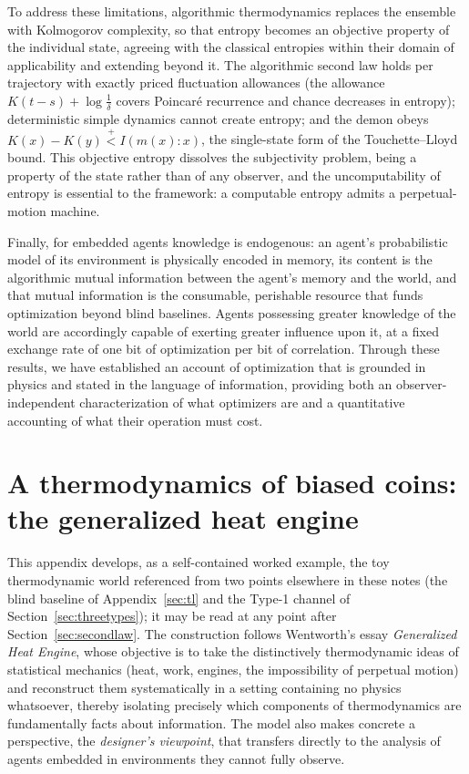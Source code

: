 \documentclass[10pt]{article}
\theoremstyle{definition}
\theoremstyle{remark}
\newcommand{\plt}{\mathrel{\stackrel{+}{<}}}
\begin{document}
To address these limitations, algorithmic thermodynamics replaces the ensemble with Kolmogorov complexity, so that entropy becomes an objective property of the individual state, agreeing with the classical entropies within their domain of applicability and extending beyond it. The algorithmic second law holds per trajectory with exactly priced fluctuation allowances (the allowance $K(t-s) + \log\frac1\delta$ covers Poincar\'e recurrence and chance decreases in entropy); deterministic simple dynamics cannot create entropy; and the demon obeys $K(x) - K(y) \plt I(m(x):x)$, the single-state form of the Touchette--Lloyd bound. This objective entropy dissolves the subjectivity problem, being a property of the state rather than of any observer, and the uncomputability of entropy is essential to the framework: a computable entropy admits a perpetual-motion machine.

Finally, for embedded agents knowledge is endogenous: an agent's probabilistic model of its environment is physically encoded in memory, its content is the algorithmic mutual information between the agent's memory and the world, and that mutual information is the consumable, perishable resource that funds optimization beyond blind baselines. Agents possessing greater knowledge of the world are accordingly capable of exerting greater influence upon it, at a fixed exchange rate of one bit of optimization per bit of correlation. Through these results, we have established an account of optimization that is grounded in physics and stated in the language of information, providing both an observer-independent characterization of what optimizers are and a quantitative accounting of what their operation must cost.

\appendix
\section{A thermodynamics of biased coins: the generalized heat engine}
\label{sec:coins}

This appendix develops, as a self-contained worked example, the toy thermodynamic world referenced from two points elsewhere in these notes (the blind baseline of Appendix~\ref{sec:tl} and the Type-1 channel of Section~\ref{sec:threetypes}); it may be read at any point after Section~\ref{sec:secondlaw}. The construction follows Wentworth's essay \emph{Generalized Heat Engine}, whose objective is to take the distinctively thermodynamic ideas of statistical mechanics (heat, work, engines, the impossibility of perpetual motion) and reconstruct them systematically in a setting containing no physics whatsoever, thereby isolating precisely which components of thermodynamics are fundamentally facts about information. The model also makes concrete a perspective, the \emph{designer's viewpoint}, that transfers directly to the analysis of agents embedded in environments they cannot fully observe.
\end{document}
